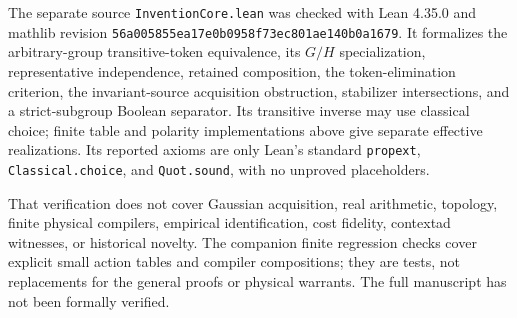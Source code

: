 \documentclass[11pt]{article}
\theoremstyle{definition}
\theoremstyle{remark}
\begin{document}
The separate source \texttt{InventionCore.lean} was checked with Lean 4.35.0 and mathlib revision \texttt{56a005855ea17e0b0958f73ec801ae140b0a1679}. It formalizes the arbitrary-group transitive-token equivalence, its $G/H$ specialization, representative independence, retained composition, the token-elimination criterion, the invariant-source acquisition obstruction, stabilizer intersections, and a strict-subgroup Boolean separator. Its transitive inverse may use classical choice; finite table and polarity implementations above give separate effective realizations. Its reported axioms are only Lean's standard \texttt{propext}, \texttt{Classical.choice}, and \texttt{Quot.sound}, with no unproved placeholders.

That verification does not cover Gaussian acquisition, real arithmetic, topology, finite physical compilers, empirical identification, cost fidelity, contextad witnesses, or historical novelty. The companion finite regression checks cover explicit small action tables and compiler compositions; they are tests, not replacements for the general proofs or physical warrants. The full manuscript has not been formally verified.
\end{document}
